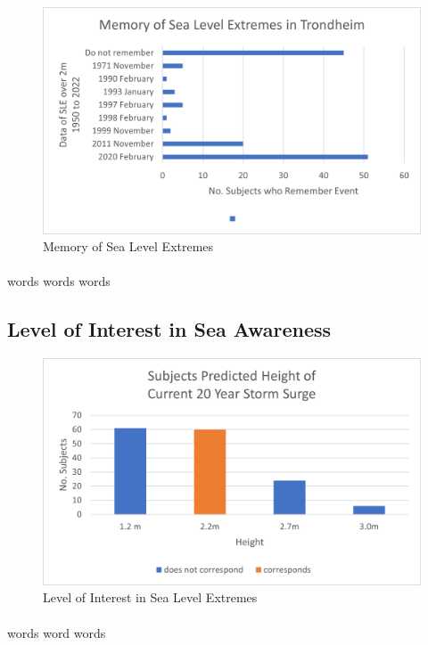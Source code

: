 \begin{figure}[h]
    \centering
    \includegraphics{fig_results/memory-sle.png}
    \caption{Memory of Sea Level Extremes}
    \label{fig:my_label}
\end{figure}
\paragraph{}
words words words
\subsection{Level of Interest in Sea Awareness}

\begin{figure}[h]
    \centering
    \includegraphics{fig_results/2022-20yrss-answer.png}
    \caption{Level of Interest in Sea Level Extremes}
    \label{fig:my_label}
\end{figure}
\paragraph{}
words word words



